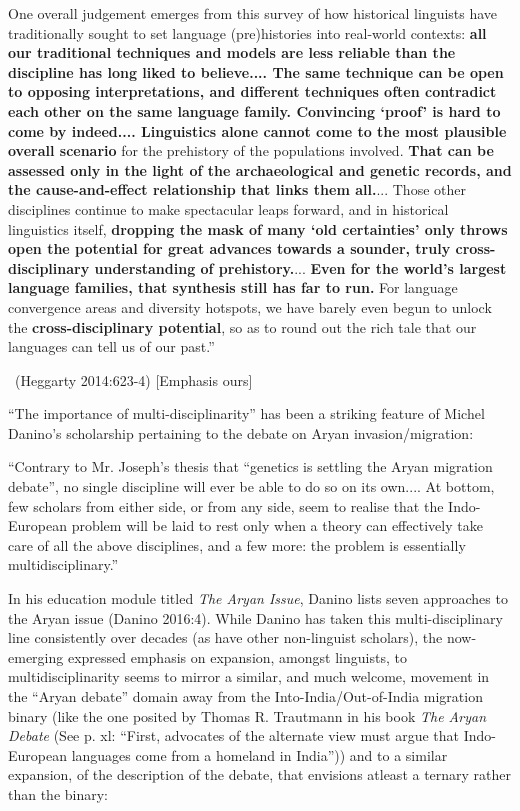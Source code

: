 \begin{myquote}
One overall judgement emerges from this survey of how historical linguists have traditionally sought to set language (pre)histories into real-world contexts: \textbf{all our traditional techniques and models are less reliable than the discipline has long liked to believe.... The same technique can be open to opposing interpretations, and different techniques often contradict each other on the same language family. Convincing ‘proof’ is hard to come by indeed.... Linguistics alone cannot come to the most plausible overall scenario} for the prehistory of the populations involved. \textbf{That can be assessed only in the light of the archaeological and genetic records, and the cause-and-effect relationship that links them all.}... Those other disciplines continue to make spectacular leaps forward, and in historical linguistics itself, \textbf{dropping the mask of many ‘old certainties’ only throws open the potential for great advances towards a sounder, truly cross-disciplinary understanding of prehistory.}... \textbf{Even for the world’s largest language families, that synthesis still has far to run.} For language convergence areas and diversity hotspots, we have barely even begun to unlock the \textbf{cross-disciplinary potential}, so as to round out the rich tale that our languages can tell us of our past.”

~\hfill (Heggarty 2014:623-4) [Emphasis ours]
\end{myquote}

“The importance of multi-disciplinarity” has been a striking feature of Michel Danino’s scholarship pertaining to the debate on Aryan invasion/migration:

\begin{myquote}
“Contrary to Mr. Joseph’s thesis that “genetics is settling the Aryan migration debate”, no single discipline will ever be able to do so on its own.... At bottom, few scholars from either side, or from any side, seem to realise that the Indo-European problem will be laid to rest only when a theory can effectively take care of all the above disciplines, and a few more: the problem is essentially multidisciplinary.”
\end{myquote}

In his education module titled \textit{The Aryan Issue}, Danino lists seven approaches to the Aryan issue (Danino 2016:4). While Danino has taken this multi-disciplinary line consistently over decades (as have other non-linguist scholars), the now-emerging expressed emphasis on expansion, amongst linguists, to multidisciplinarity seems to mirror a similar, and much welcome, movement in the “Aryan debate” domain away from the Into-India/Out-of-India migration binary (like the one posited by Thomas R. Trautmann in his book \textit{The Aryan Debate} (See p. xl: “First, advocates of the alternate view must argue that Indo-European languages come from a homeland in India”)) and to a similar expansion, of the description of the debate, that envisions atleast a ternary rather than the binary:


